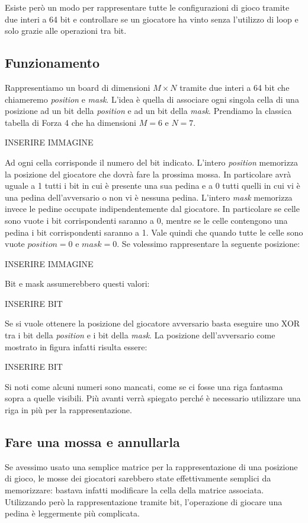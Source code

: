 \documentclass[a4paper]{article}
\begin{document}
Esiste però un modo per rappresentare tutte le configurazioni di gioco tramite
due interi a 64 bit e controllare se un giocatore ha vinto senza l'utilizzo di
loop e solo grazie alle operazioni tra bit.

\subsection{Funzionamento}
Rappresentiamo un board di dimensioni $M \times N$ tramite due interi a 64 bit
che chiameremo \emph{position} e \emph{mask}. L'idea è quella di associare ogni
singola cella di una posizione ad un bit della \emph{position} e ad un bit della
\emph{mask}. Prendiamo la classica tabella di Forza 4 che ha dimensioni $M = 6$ 
e $N = 7$.

\begin{center}
  INSERIRE IMMAGINE
\end{center}
Ad ogni cella corrisponde il numero del bit indicato. L'intero \emph{position} 
memorizza la posizione del giocatore che dovrà fare la prossima mossa. In 
particolare avrà uguale a 1 tutti i bit in cui è presente una sua pedina e a 0
tutti quelli in cui vi è una pedina dell'avversario o non vi è nessuna pedina. 
L'intero \emph{mask} memorizza invece le pedine occupate indipendentemente dal
giocatore. In particolare se celle sono vuote i bit corrispondenti saranno a 0, 
mentre se le celle contengono una pedina i bit corrispondenti saranno a 1. 
Vale quindi che quando tutte le celle sono vuote $position = 0$ e $mask = 0$. Se 
volessimo rappresentare la seguente posizione:
\begin{center}
  INSERIRE IMMAGINE
\end{center}
Bit e mask assumerebbero questi valori:\medskip
\begin{center}
  INSERIRE BIT
\end{center}

Se si vuole ottenere la posizione del giocatore avversario basta eseguire uno
XOR tra i bit della \emph{position} e i bit della \emph{mask}. La posizione
dell'avversario come mostrato in figura infatti risulta essere:
\begin{center}
  INSERIRE BIT
\end{center}
Si noti come alcuni numeri sono mancati, come se ci fosse una riga fantasma 
sopra a quelle visibili. Più avanti verrà spiegato perché è necessario 
utilizzare una riga in più per la rappresentazione.


\subsection{Fare una mossa e annullarla}
Se avessimo usato una semplice matrice per la rappresentazione di una posizione
di gioco, le mosse dei giocatori sarebbero state effettivamente semplici da
memorizzare: bastava infatti modificare la cella della matrice associata. 
Utilizzando però la rappresentazione tramite bit, l'operazione di giocare una
pedina è leggermente più complicata. 
\end{document}
